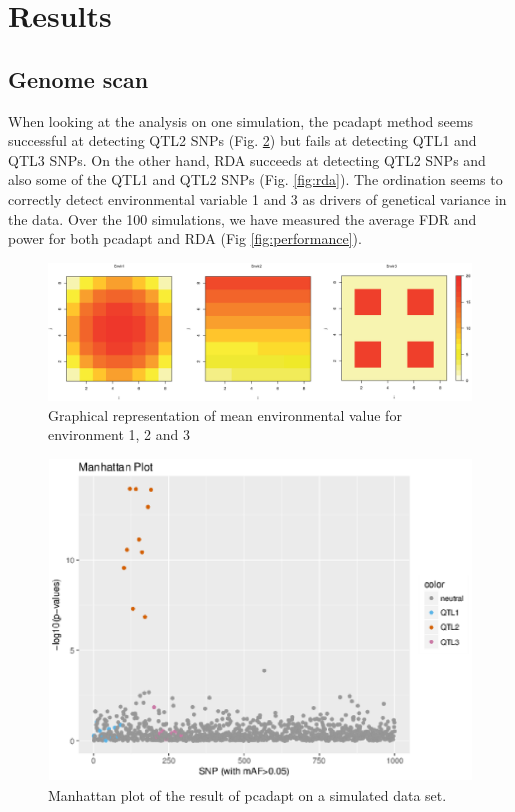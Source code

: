 \documentclass[nogrid]{MBE}%
\begin{document}
\section{Results}

\subsection{Genome scan}

When looking at the analysis on one simulation, the pcadapt method seems successful at detecting QTL2 SNPs (Fig. \ref{fig:pcadapt}) but fails at detecting QTL1 and QTL3 SNPs. On the other hand, RDA succeeds at detecting QTL2 SNPs and also some of the QTL1 and QTL2 SNPs (Fig. \ref{fig:rda}). The ordination seems to correctly detect environmental variable 1 and 3 as drivers of genetical variance in the data. Over the 100 simulations, we have measured the average FDR and power for both pcadapt and RDA (Fig \ref{fig:performance}). 


\begin{figure}[t]
\begin{center}
\includegraphics[height=0.25\textheight]{figures/simulatedenvironment.eps}
\end{center}
\caption{Graphical representation of mean environmental value for environment 1, 2 and 3}%
\label{fig:simulatedenvir}%
\end{figure}



\begin{figure}[t]
\begin{center}
\includegraphics[height=0.21\textheight]{figures/sim5_pcadapt.eps}
\end{center}
\caption{Manhattan plot of the result of pcadapt on a simulated data set.}%
\label{fig:pcadapt}%
\end{figure}
\end{document}
